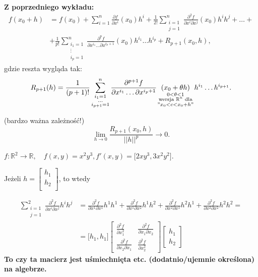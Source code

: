 \documentclass[../main.tex]{subfiles}
\begin{document}
\textbf{Z poprzedniego wykładu:}
\begin{align*}
    f(x_0+h) &= f(x_0) + \sum_{i=1}^n \frac{\partial f}{\partial x^i} (x_0) h^i + \frac{1}{2!}\sum_{\substack{i=1\\ j=1}}^n \frac{\partial^2 f}{\partial x^i \partial x^j} (x_0) h^i h^j  + \dots +  \\
&+ \frac{1}{p!} \sum_{\substack{i_1 = 1\\ \vdots \\ i_p = 1}}^n \frac{\partial^p f}{\partial x^{i_1} \dots \partial x^{i_p+1}} (x_0) h^{i_1} \dots h^{i_p} + R_{p+1} (x_0, h),
\end{align*}
gdzie reszta wygląda tak:
\[
    R_{p+1} (h) = \frac{1}{(p+1)!} \sum_{\substack{i_1 = 1\\ \dots \\i_{p+1} = 1}}^n \frac{\partial^{p+1} f}{\partial x^{i_1} \dots \partial x^{i_p+1}} \underset{\substack{0<\theta<1\\ \text{ wersja } \mathbb{R}^n \text{ dla }\\"x_0 < c < x_0 +h"}}{(x_0+\theta h)} h^{i_1} \dots h^{i_{p+1}}.
\]

\begin{obserwacja}(bardzo ważna zależność!)\\
    \[
        \lim\limits_{h \to 0}\frac{R_{p+1} (x_0,h)}{||h||^p} \to 0.
    \]
\end{obserwacja}

\begin{przyklad}
$f: \mathbb{R}^2 \to \mathbb{R}, \quad f(x,y) = x^2y^3, f'(x,y) = \Big [ 2xy^3, 3x^2y^2 \Big ]$.

Jeżeli $h = \left [ \begin{matrix}
h_1\\
h_2\\
 \end{matrix}\right ]$, to wtedy

\begin{align*}
\sum_{\substack{i=1 \\ j=1}}^2 \frac{\partial^2 f}{\partial x^i \partial x^j} h^i h^j
&=\frac{\partial^2 f}{\partial x^1 \partial x^1} h^1 h^1 + \frac{\partial^2 f}{\partial x^1 \partial x^2} h^1 h^2 + \frac{\partial^2 f}{\partial x^2 \partial x^1} h^2 h^1 + \frac{\partial^2 f}{\partial x^2 \partial x^2} h^2 h^2 =\\
&= \Big [ h_1, h_1 \Big ] \left [ \begin{matrix}
\frac{\partial^2 f}{\partial x_1^2}  &\frac{\partial^2 f}{\partial x_1 \partial x_2} \\
\frac{\partial^2 f}{\partial x_2 \partial x_1}  &\frac{\partial^2 f}{\partial x_2^2}  \end{matrix}\right ] \left [ \begin{matrix}
h_1\\
h_2 \end{matrix}\right ]
\end{align*}
    \textbf{To czy ta macierz jest uśmiechnięta etc. (dodatnio/ujemnie określona) na algebrze.}

\end{przyklad}
\end{document}
